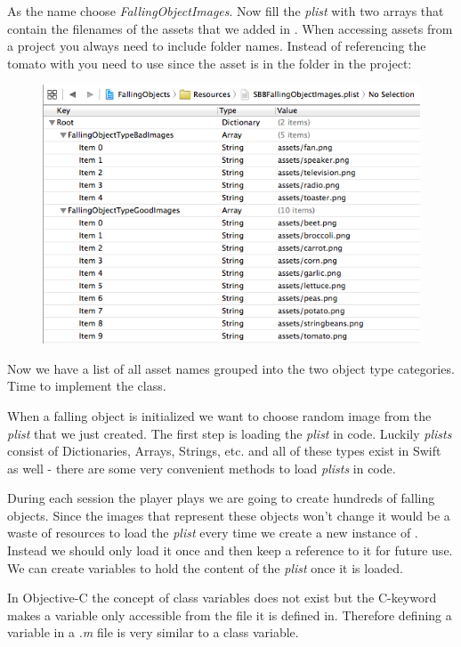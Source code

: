 As the name choose \textit{FallingObjectImages}. Now fill the \textit{plist}
with two arrays that contain the filenames of the assets that we added in \SB{}.
When accessing assets from a \SB{} project you always need to include folder
names. Instead of referencing the tomato with  you need
to use  since the asset is in the
 folder in the \SB{} project:

\begin{figure}[H]
		\centering
		\includegraphics[width=0.7\linewidth]{images/Chapter2/plist_setup.png}
\end{figure}
Now we have a list of all asset names grouped into the two object type
categories. Time to implement the  class.

When a falling object is initialized we want to
choose random image from the \textit{plist} that we just created.
The first step is loading the \textit{plist} in code. Luckily \textit{plists}
consist of Dictionaries, Arrays, Strings, etc. and all of these types exist in
Swift as well - there are some very convenient methods to load
\textit{plists} in code. 

During each session the player plays we are going to create hundreds of
falling objects. Since the images that represent these objects won't change it
would be a waste of resources to load the \textit{plist} every time we create a
new instance of . Instead we should only load it
once and then keep a reference to it for future use. We can create
 variables to hold the content of the \textit{plist} once it
is loaded. 

\begin{details}[frametitle={Static variables in Objective-C}] 
In Objective-C the concept of class variables does not exist but the C-keyword
 makes a variable only accessible from the file it is
defined in. Therefore defining a  variable in a \textit{.m}
file is very similar to a class variable.
\end{details}

